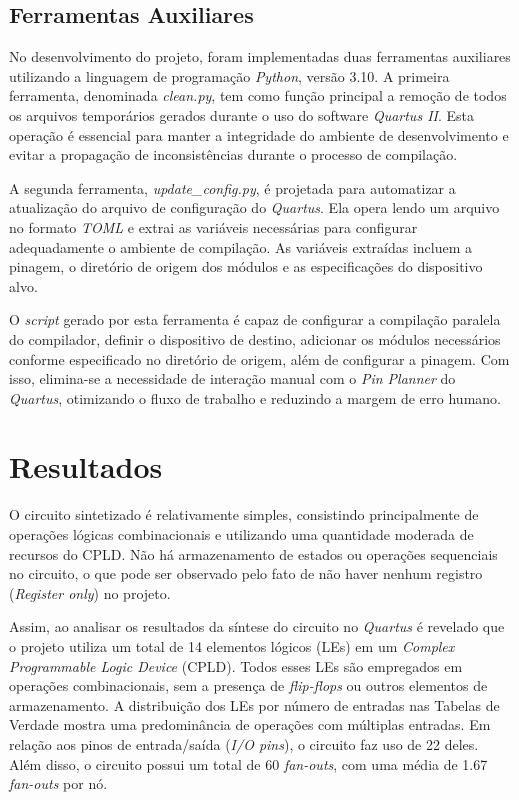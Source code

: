 \documentclass[
	article,			%
	11pt,				%
	oneside,			%
	a4paper,			%
	english,			%
	brazil,				%
	sumario=tradicional
	]{abntex2}
\begin{document}
\subsection{Ferramentas Auxiliares}

No desenvolvimento do projeto, foram implementadas duas ferramentas auxiliares utilizando a linguagem de programação \textit{Python}, versão 3.10. A primeira ferramenta, denominada \textit{clean.py}, tem como função principal a remoção de todos os arquivos temporários gerados durante o uso do software \textit{Quartus II}. Esta operação é essencial para manter a integridade do ambiente de desenvolvimento e evitar a propagação de inconsistências durante o processo de compilação.

A segunda ferramenta, \textit{update\_config.py}, é projetada para automatizar a atualização do arquivo de configuração do \textit{Quartus}. Ela opera lendo um arquivo no formato \textit{TOML} e extrai as variáveis necessárias para configurar adequadamente o ambiente de compilação. As variáveis extraídas incluem a pinagem, o diretório de origem dos módulos e as especificações do dispositivo alvo.

O \textit{script} gerado por esta ferramenta é capaz de configurar a compilação paralela do compilador, definir o dispositivo de destino, adicionar os módulos necessários conforme especificado no diretório de origem, além de configurar a pinagem. Com isso, elimina-se a necessidade de interação manual com o \textit{Pin Planner} do \textit{Quartus}, otimizando o fluxo de trabalho e reduzindo a margem de erro humano.


\section{Resultados}

O circuito sintetizado é relativamente simples, consistindo principalmente de operações lógicas combinacionais e utilizando uma quantidade moderada de recursos do CPLD. Não há armazenamento de estados ou operações sequenciais no circuito, o que pode ser observado pelo fato de não haver nenhum registro (\textit{Register only}) no projeto. 


Assim, ao analisar os resultados da síntese do circuito no \textit{Quartus} é revelado que o projeto utiliza um total de 14 elementos lógicos (LEs) em um \textit{Complex Programmable Logic Device} (CPLD). Todos esses LEs são empregados em operações combinacionais, sem a presença de \textit{flip-flops} ou outros elementos de armazenamento. A distribuição dos LEs por número de entradas nas Tabelas de Verdade mostra uma predominância de operações com múltiplas entradas. Em relação aos pinos de entrada/saída (\textit{I/O pins}), o circuito faz uso de 22 deles. Além disso, o circuito possui um total de 60 \textit{fan-outs}, com uma média de 1.67 \textit{fan-outs} por nó. 
\end{document}
